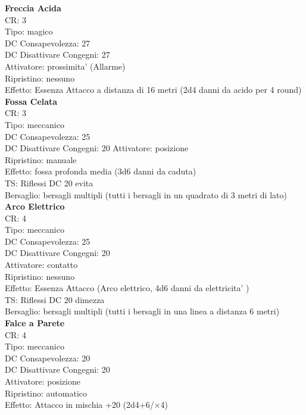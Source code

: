 \documentclass[a4paper,11pt,twoside,openany]{dndbook}
\begin{document}
{\begin{multicols}{2}
\textbf{Freccia Acida}\\
CR: 3 \\
Tipo: magico \\
DC Consapevolezza: 27 \\
DC Disattivare Congegni: 27 \\
Attivatore: prossimita' (Allarme) \\
Ripristino: nessuno \\
Effetto: Essenza Attacco a distanza di 16 metri (2d4 danni da acido per 4 round)\\

\textbf{Fossa Celata}\\
CR: 3 \\
Tipo: meccanico \\
DC Consapevolezza: 25 \\
DC Disattivare Congegni: 20 
Attivatore: posizione \\
Ripristino: manuale \\
Effetto: fossa profonda media (3d6 danni da caduta) \\
TS: Riflessi DC 20 evita \\
Bersaglio: bersagli multipli (tutti i bersagli in un quadrato di 3 metri di lato)\\

\textbf{Arco Elettrico}\\
CR: 4 \\
Tipo: meccanico \\
DC Consapevolezza: 25 \\
DC Disattivare Congegni: 20 \\
Attivatore: contatto \\
Ripristino: nessuno \\
Effetto: Essenza Attacco (Arco elettrico, 4d6 danni da elettricita' )\\
TS: Riflessi DC 20 dimezza \\
Bersaglio: bersagli multipli (tutti i bersagli in una linea a distanza 6 metri)\\

\textbf{Falce a Parete}\\
CR: 4 \\
Tipo: meccanico \\
DC Consapevolezza: 20 \\
DC Disattivare Congegni: 20 \\
Attivatore: posizione \\
Ripristino: automatico \\
Effetto: Attacco in mischia +20 (2d4+6/×4)\\


\end{multicols}}
\end{document}
